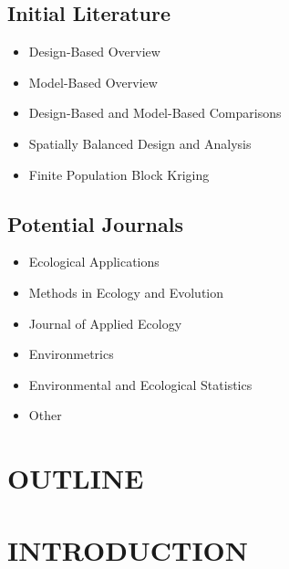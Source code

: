 \subsection*{Initial Literature}

\begin{itemize}
  \item Design-Based Overview \citep{Sarndal2003model, Lohr2009sampling}
  \item Model-Based Overview \citep{Cressie2015statistics, Schabenberger2017statistical}
  \item Design-Based and Model-Based Comparisons \citep{Hansen1983evaluation, Brus1997random, VerHoef2002sampling, Cooper2006sampling, sterba2009alternative, Brus2020statistical, Chan2020bayesian}
  \item Spatially Balanced Design and Analysis \citep{StevensOlsen2003VarianceEstimation, StevensOlsen2004GRTS}
  \item Finite Population Block Kriging \citep{VerHoef2002sampling, VerHoef2008spatial, Higham2020adjusting}
\end{itemize}

\subsection*{Potential Journals}
\begin{itemize}
  \item Ecological Applications
  \item Methods in Ecology and Evolution
  \item Journal of Applied Ecology
  \item Environmetrics
  \item Environmental and Ecological Statistics
  \item Other
\end{itemize}


\section*{\centering OUTLINE}

\section{\centering INTRODUCTION}\label{sec:introduction}

